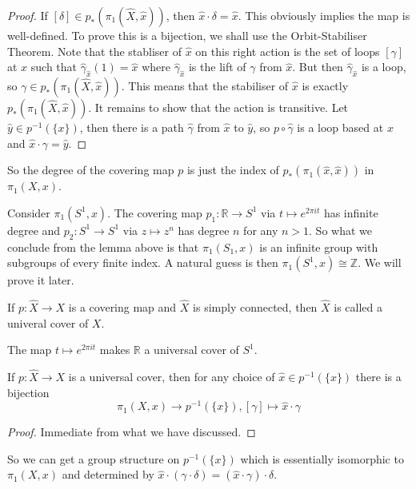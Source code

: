 \begin{proof}
    If $[\delta]\in p_\ast(\pi_1(\hat{X},\hat{x}))$, then $\hat{x}\cdot\delta=\hat{x}$.
    This obviously implies the map is well-defined.
    To prove this is a bijection, we shall use the Orbit-Stabiliser Theorem.
    Note that the stabliser of $\hat{x}$ on this right action is the set of loops $[\gamma]$ at $x$ such that $\hat\gamma_{\hat{x}}(1)=\hat{x}$ where $\hat{\gamma}_{\hat{x}}$ is the lift of $\gamma$ from $\hat{x}$.
    But then $\hat\gamma_{\hat{x}}$ is a loop, so $\gamma\in p_\ast(\pi_1(\hat{X},\hat{x}))$.
    This means that the stabiliser of $\hat{x}$ is exactly $p_\ast(\pi_1(\hat{X},\hat{x}))$.
    It remains to show that the action is transitive.
    Let $\hat{y}\in p^{-1}(\{x\})$, then there is a path $\hat{\gamma}$ from $\hat{x}$ to $\hat{y}$, so $p\circ\hat{\gamma}$ is a loop based at $x$ and $\hat{x}\cdot\gamma=\hat{y}$.
\end{proof}
\begin{remark}
    So the degree of the covering map $p$ is just the index of $p_\ast(\pi_1(\hat{x},\hat{x}))$ in $\pi_1(X,x)$.
\end{remark}
\begin{example}
    Consider $\pi_1(S^1,x)$.
    The covering map $p_1:\mathbb R\to S^1$ via $t\mapsto e^{2\pi it}$ has infinite degree and $p_2:S^1\to S^1$ via $z\mapsto z^n$ has degree $n$ for any $n>1$.
    So what we conclude from the lemma above is that $\pi_1(S_1,x)$ is an infinite group with subgroups of every finite index.
    A natural guess is then $\pi_1(S^1,x)\cong\mathbb Z$.
    We will prove it later.
\end{example}
\begin{definition}
    If $p:\hat{X}\to X$ is a covering map and $\hat{X}$ is simply connected, then $\hat{X}$ is called a univeral cover of $X$.
\end{definition}
\begin{example}
    The map $t\mapsto e^{2\pi it}$ makes $\mathbb R$ a universal cover of $S^1$.
\end{example}
\begin{corollary}
    If $p:\hat{X}\to X$ is a universal cover, then for any choice of $\hat{x}\in p^{-1}(\{x\})$ there is a bijection
    $$\pi_1(X,x)\to p^{-1}(\{x\}),[\gamma]\mapsto \hat{x}\cdot\gamma$$
\end{corollary}
\begin{proof}
    Immediate from what we have discussed.
\end{proof}
So we can get a group structure on $p^{-1}(\{x\})$ which is essentially isomorphic to $\pi_1(X,x)$ and determined by $\hat{x}\cdot (\gamma\cdot\delta)=(\hat{x}\cdot\gamma)\cdot\delta$.
